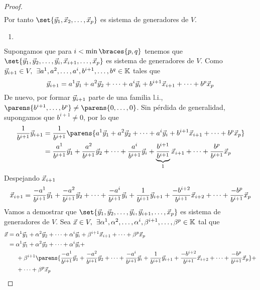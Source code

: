 \documentclass[../algebra_lineal.tex]{subfiles}
\begin{document}
\begin{proof}
\begin{align*}
    \end{align*}
    Por tanto $\set{\vy_1, \vx_2, \dots, \vx_p}$ es sistema de generadores de $V$.
    \begin{enumerate}[itemindent=50pt]
        \item[\hspace{20mm}\protect\fbox{Paso inductivo}] $ $ \linebreak
    \end{enumerate}
    Supongamos que para $i < \min \braces{p, q}$ tenemos que $\set{\vy_1, \vy_2, \dots, \vy_{i}, \vx_{i+1}, \dots, \vx_p}$ es sistema de generadores de $V$. Como $\vec{y}_{i+1} \in V, \hspace{1.5mm} \exists {a}^{1}, {a}^{2}, \dots, {a}^{i}, b^{i+1}, \dots, b^q \in \mathbb{K}$ tales que 
    \[
        \vec{y}_{i+1} = {a}^{1}\vec{y}_{1}+{a}^{2}\vec{y}_{2}+\dots+{a}^{i}\vec{y}_{i} + b^{i+1}\vec{x}_{i+1} + \dots + b^p \vec{x}_p 
    \]
    De nuevo, por formar $\vec{y}_{i+1}$ parte de una familia l.i., $\parens{b^{i+1}, \dots, b^p} \ne \parens{0, \dots, 0}$. Sin pérdida de generalidad, supongamos que $b^{i+1} \ne 0$, por lo que
    \begin{align*}
        \frac{1}{b^{i+1}}\vy_{i+1} &= \frac{1}{b^{i+1}} \parens{\lincomb{a}{y}{i} + b^{i+1}\vx_{i+1} + \dots + b^p \vx_p} \\
                                   &= \frac{a^1}{b^{i+1}} \vy_1 + \frac{a^2}{b^{i+1}} \vy_2 + \dots + \frac{a^i}{b^{i+1}}\vy_i + \underbrace{\frac{b^{i+1}}{b^{i+1}}}_{1}\vx_{i+1} + \dots + \frac{b^{p}}{b^{i+1}}\vx_{p} 
    \end{align*}
    Despejando $\vec{x}_{i+1}$
    \[
        \vec{x}_{i+1} = \frac{-a^1}{b^{i+1}}\vec{y}_1 + \frac{-a^2}{b^{i+1}}\vec{y}_2 + \dots + \frac{-a^i}{b^{i+1}}\vec{y}_i + \frac{1}{b^{i+1}} \vec{y}_{i+1} + \frac{-b^{i+2}}{b^{i+1}}\vec{x}_{i+2} +  \dots + \frac{-b^p}{b^{i+1}}\vec{x}_p
    \]
    Vamos a demostrar que $\set{\vy_1, \vy_2, \dots, \vy_{i}, \vy_{i+1}, \dots, \vx_p}$ es sistema de generadores de $V$. Sea $\vec{x} \in V, \hspace{1.5mm} \exists {\alpha}^{1}, {\alpha}^{2}, \dots, {\alpha}^{i},\beta^{i+1}, \dots, \beta^p \in \mathbb{K}$ tal que 
    \begin{align*}
        \vx &= \lincomb{\alpha}{y}{i} + \beta^{i+1}\vx_{i+1}+\dots  + \beta^p\vx_p \\
            &= \lincomb{\alpha}{y}{i} + \\
            &\hspace{5mm} + \beta^{i+1} \parens{\frac{-a^1}{b^{i+1}}\vy_1 + \frac{-a^2}{b^{i+1}}\vy_2 + \dots + \frac{-a^i}{b^{i+1}}\vy_i + \frac{1}{b^{i+1}} \vy_{i+1} + \frac{-b^{i+2}}{b^{i+1}}\vx_{i+2} +  \dots + \frac{-b^p}{b^{i+1}}\vx_p} + \\
            &\hspace{5mm} + \dots + \beta^p\vx_{p} \\

\end{align*}
\end{proof}
\end{document}
